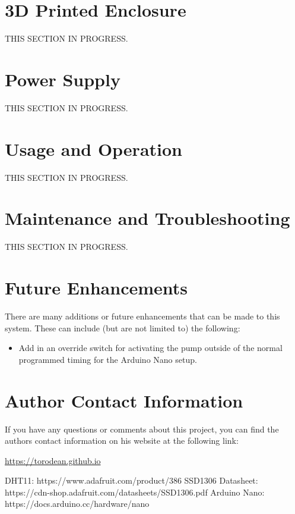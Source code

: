 \documentclass{article}
\begin{document}
\begin{multicols}{2}
		\section{3D Printed Enclosure}
		THIS SECTION IN PROGRESS.
		
		\section{Power Supply}
		THIS SECTION IN PROGRESS.
		
		\section{Usage and Operation}
		THIS SECTION IN PROGRESS.
		
		\section{Maintenance and Troubleshooting}
		THIS SECTION IN PROGRESS.
		
		\section{Future Enhancements}
		There are many additions or future enhancements that can be made to this system. These can include (but are not limited to) the following:
		\begin{itemize}
			\item Add in an override switch for activating the pump outside of the normal programmed timing for the Arduino Nano setup.
		\end{itemize}
	
		\section{Author Contact Information}
		
		If you have any questions or comments about this project, you can find the authors contact information on his website at the following link:
		
		\url{https://torodean.github.io}
		
\end{multicols} %

\begin{thebibliography}{X}
	 DHT11: https://www.adafruit.com/product/386
	 SSD1306 Datasheet: https://cdn-shop.adafruit.com/datasheets/SSD1306.pdf
	 Arduino Nano: https://docs.arduino.cc/hardware/nano
\end{thebibliography}	
	
\end{document}
